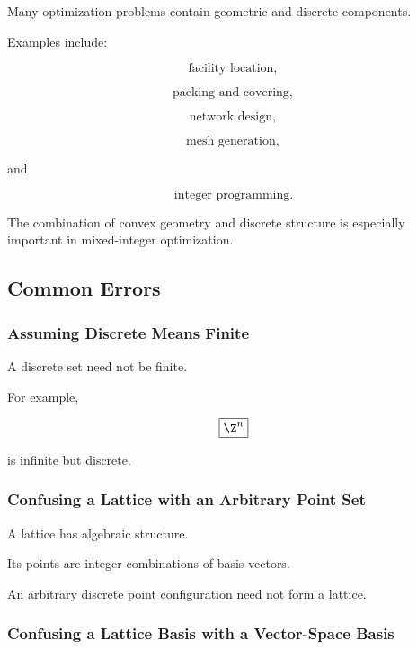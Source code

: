 Many optimization problems contain geometric and discrete components.

Examples include:

\[
\boxed{
\text{facility location},
}
\]

\[
\boxed{
\text{packing and covering},
}
\]

\[
\boxed{
\text{network design},
}
\]

\[
\boxed{
\text{mesh generation},
}
\]

and

\[
\boxed{
\text{integer programming}.
}
\]

The combination of convex geometry and discrete structure is especially
important in mixed-integer optimization.

\subsection{Common Errors}
\label{subsec:discrete-geometry-common-errors}

\subsubsection{Assuming Discrete Means Finite}

A discrete set need not be finite.

For example,

\[
\boxed{
\Z^n
}
\]

is infinite but discrete.

\subsubsection{Confusing a Lattice with an Arbitrary Point Set}

A lattice has algebraic structure.

Its points are integer combinations of basis vectors.

An arbitrary discrete point configuration need not form a lattice.

\subsubsection{Confusing a Lattice Basis with a Vector-Space Basis}


